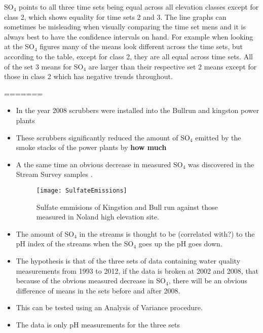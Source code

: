 SO$_4$ points to all three time sets being equal across all elevation classes except for class 2, which shows equality for time sets 2 and 3.  
The line graphs can sometimes be misleading when visually comparing the time set mens and it is always best to have the confidence intervals on hand.
For example when looking at the SO$_4$ figures many of the means look different across the time sets, but according to the table, except for class 2, they are all equal across time sets.
All of the set 3 means for SO$_4$ are larger than their respective set 2 means except for those in class 2 which has negative trends throughout.

=======
\begin{itemize}
    \item In the year 2008 scrubbers were installed into the Bullrun and kingston power plants
    \item These scrubbers significantly reduced the amount of SO$_4$ emitted by the smoke stacks of the power plants by {\bf how much}
    \item A the same time an obvious decrease in measured SO$_4$ was discovered in the Stream Survey samples \citep{annualreport2012}.
   \begin{figure}[h!]
  \centering
  \texttt{[image: SulfateEmissions]}\\
  \caption{Sulfate emmisions of Kingstion and Bull run against those measured in Noland high elevation site.}\label{fig:sulfateemissions}
\end{figure}
    \item The amount of SO$_4$ in the streams is thought to be (correlated with?) to the pH index of the streams when the SO$_4$ goes up the pH goes down.
    \item The hypothesis is that of the three sets of data containing water quality measurements from 1993 to 2012, if the data is broken at 2002 and 2008, that
    because of the obvious measured decrease in SO$_4$, there will be an obvious difference of means in the sets before and after 2008.
    \item This can be tested using an Analysis of Variance procedure.
    \item The data is only pH measurements for the three sets

\end{itemize}
